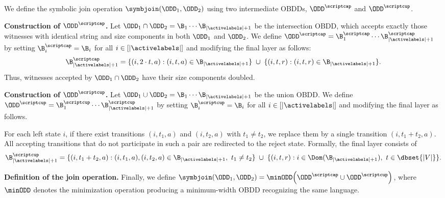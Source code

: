 We define the symbolic join operation
$\symbjoin(\ODD_1,\ODD_2)$ using two intermediate OBDDs,
$\ODD^{\scriptcap}$ and $\ODD^{\scriptcup}$.

\medskip
\noindent\textbf{Construction of $\ODD^{\scriptcap}$.}
Let $\ODD_1 \cap \ODD_2 = \B_1 \cdots \B_{|\activelabels|+1}$ be the intersection
OBDD, which accepts exactly those witnesses with identical string and size
components in both $\ODD_1$ and $\ODD_2$.
We define $\ODD^{\scriptcap} = \B_1^{\scriptcap} \cdots
\B_{|\activelabels|+1}^{\scriptcap}$ by setting
$\B_i^{\scriptcap} = \B_i$ for all $i \in [|\activelabels|]$ and modifying the
final layer as follows:
\[
\B_{|\activelabels|+1}^{\scriptcap}
=
\{(i,2\cdot t,a) : (i,t,a) \in \B_{|\activelabels|+1}\}
\;\cup\;
\{(i,t,r) : (i,t,r) \in \B_{|\activelabels|+1}\}.
\]
Thus, witnesses accepted by $\ODD_1 \cap \ODD_2$ have their size components
doubled.

\medskip
\noindent\textbf{Construction of $\ODD^{\scriptcup}$.}
Let $\ODD_1 \cup \ODD_2 = \B_1 \cdots \B_{|\activelabels|+1}$ be the union OBDD.
We define $\ODD^{\scriptcup} = \B_1^{\scriptcup} \cdots
\B_{|\activelabels|+1}^{\scriptcup}$ by setting
$\B_i^{\scriptcup} = \B_i$ for all $i \in [|\activelabels|]$ and modifying the
final layer as follows.

For each left state $i$, if there exist transitions $(i,t_1,a)$ and $(i,t_2,a)$
with $t_1 \neq t_2$, we replace them by a single transition
$(i,t_1+t_2,a)$. All accepting transitions that do not participate in such a
pair are redirected to the reject state. Formally, the final layer consists of
\[
\B_{|\activelabels|+1}^{\scriptcup}
=
\{(i,t_1+t_2,a) : (i,t_1,a),(i,t_2,a)\in \B_{|\activelabels|+1},\ t_1\neq t_2\}
\;\cup\;
\{(i,t,r) : i \in \Dom(\B_{|\activelabels|+1}),\ t \in \dbset{|V|}\}.
\]

\medskip
\noindent\textbf{Definition of the join operation.}
Finally, we define
$\symbjoin(\ODD_1,\ODD_2)
=
\minODD\!\left(\ODD^{\scriptcap} \cup \ODD^{\scriptcup}\right)$,
where $\minODD$ denotes the minimization operation producing a minimum-width
OBDD recognizing the same language.







